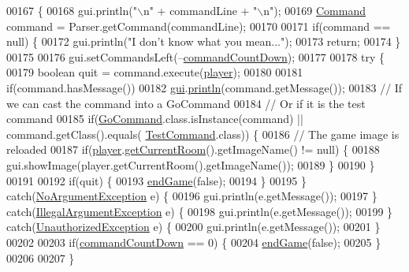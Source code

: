 \begin{DoxyCode}
00167                                                    \{
00168         gui.println(\textcolor{stringliteral}{"\(\backslash\)n"} + commandLine + \textcolor{stringliteral}{"\(\backslash\)n"});
00169         \hyperlink{classCommand}{Command} command = Parser.getCommand(commandLine);
00170 
00171         \textcolor{keywordflow}{if}(command == null) \{
00172             gui.println(\textcolor{stringliteral}{"I don't know what you mean..."});
00173             \textcolor{keywordflow}{return};
00174         \}
00175 
00176         gui.setCommandsLeft(--\hyperlink{classGameEngine_ad4ff8d760eced9c7b76cdeb0dc989975}{commandCountDown});
00177 
00178         \textcolor{keywordflow}{try} \{
00179             \textcolor{keywordtype}{boolean} quit = command.execute(\hyperlink{classGameEngine_a4666c6719428cc43014b30b305eeef5d}{player});
00180 
00181             \textcolor{keywordflow}{if}(command.hasMessage())
00182                 \hyperlink{classGameEngine_a2a7d0bb6183b3f3ef3ee2008926374a0}{gui}.\hyperlink{classUserInterface_a79f606b4b1f5d1523e50eea00039ed94}{println}(command.getMessage());
00183             \textcolor{comment}{// If we can cast the command into a GoCommand}
00184             \textcolor{comment}{// Or if it is the test command}
00185             \textcolor{keywordflow}{if}(\hyperlink{classGoCommand}{GoCommand}.class.isInstance(command) || command.getClass().equals(
      \hyperlink{classTestCommand}{TestCommand}.class)) \{
00186                 \textcolor{comment}{// The game image is reloaded}
00187                 \textcolor{keywordflow}{if}(\hyperlink{classGameEngine_a4666c6719428cc43014b30b305eeef5d}{player}.\hyperlink{classPlayer_a3a3107df50fc4e35e8c0f46c3f776ce6}{getCurrentRoom}().getImageName() != null) \{
00188                     gui.showImage(player.getCurrentRoom().getImageName());
00189                 \}
00190             \}
00191 
00192             \textcolor{keywordflow}{if}(quit) \{
00193                 \hyperlink{classGameEngine_a1f5fa36c5dfc36c9a963fe439afc057b}{endGame}(\textcolor{keyword}{false});
00194             \}
00195         \} \textcolor{keywordflow}{catch}(\hyperlink{classNoArgumentException}{NoArgumentException} e) \{
00196             gui.println(e.getMessage());
00197         \} \textcolor{keywordflow}{catch}(\hyperlink{classIllegalArgumentException}{IllegalArgumentException} e) \{
00198             gui.println(e.getMessage());
00199         \} \textcolor{keywordflow}{catch}(\hyperlink{classUnauthorizedException}{UnauthorizedException} e) \{
00200             gui.println(e.getMessage());
00201         \}
00202 
00203         \textcolor{keywordflow}{if}(\hyperlink{classGameEngine_ad4ff8d760eced9c7b76cdeb0dc989975}{commandCountDown} == 0) \{
00204             \hyperlink{classGameEngine_a1f5fa36c5dfc36c9a963fe439afc057b}{endGame}(\textcolor{keyword}{false});
00205         \}
00206 
00207     \}
\end{DoxyCode}


